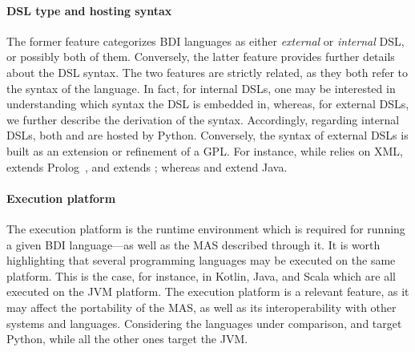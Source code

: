 \paragraph{\ac{DSL} type and hosting syntax}

The former feature categorizes \ac{BDI} languages as either \emph{external} or \emph{internal} \ac{DSL}, or possibly both of them.
%
Conversely, the latter feature provides further details about the \ac{DSL} syntax.
%
The two features are strictly related, as they both refer to the syntax of the language.
%
In fact, for internal \acp{DSL},
one may be interested in understanding which syntax the \ac{DSL} is embedded in,
whereas, for external \acp{DSL}, we further describe the derivation of the syntax.
%
Accordingly, regarding internal \acp{DSL},
both \spadebdi{} and \phidias{} are hosted by Python.
%
Conversely, the syntax of external \acp{DSL} is built as an extension or refinement of a \ac{GPL}.
%
For instance, while \jadex{} relies on XML,
\goal{} extends Prolog~\cite{KornerLBCDHMWDA22}, and \jason{} extends \agentspeak{}; whereas \astra{} and \jack{} extend Java.

\paragraph{Execution platform}

The execution platform is the runtime environment which is required for running a given \ac{BDI} language---as well as the \ac{MAS} described through it.
%
It is worth highlighting that several programming languages may be executed on the same platform.
%
This is the case,
for instance,
in Kotlin, Java, and Scala which are all executed on the \ac{JVM} platform.
%
The execution platform is a relevant feature, as it may affect the portability of the \ac{MAS},
as well as its interoperability with other systems and languages.
%
Considering the languages under comparison,
\spadebdi{} and \phidias{} target Python,
while all the other ones target the \ac{JVM}.

